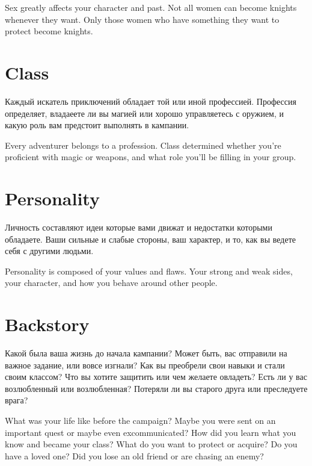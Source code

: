 \documentclass[a5paper,11pt]{book}
\begin{document}
\begin{multicols}{2}
\begin{en}
Sex greatly affects your character and past. Not all women can become knights whenever they want. Only those women who have something they want to protect become knights.
\end{en}

\section{Class}
\begin{ru}
Каждый искатель приключений обладает той или иной профессией. Профессия определяет, владаеете ли вы магией или хорошо управляетесь с оружием, и какую роль вам предстоит выполнять в кампании.
\end{ru}

\begin{en}
Every adventurer belongs to a profession. Class determined whether you're proficient with magic or weapons, and what role you'll be filling in your group.
\end{en}

\section{Personality}
\begin{ru}
Личность составляют идеи которые вами движат и недостатки которыми обладаете. Ваши сильные и слабые стороны, ваш характер, и то, как вы ведете себя с другими людьми.
\end{ru}

\begin{en}
Personality is composed of your values and flaws. Your strong and weak sides, your character, and how you behave around other people.
\end{en}

\section{Backstory}
\begin{ru}
Какой была ваша жизнь до начала кампании? Может быть, вас отправили на важное задание, или вовсе изгнали? Как вы преобрели свои навыки и стали своим классом? Что вы хотите защитить или чем желаете овладеть? Есть ли у вас возлюбленный или возлюбленная? Потеряли ли вы старого друга или преследуете врага?
\end{ru}

\begin{en}
What was your life like before the campaign? Maybe you were sent on an important quest or maybe even excommunicated? How did you learn what you know and became your class? What do you want to protect or acquire? Do you have a loved one? Did you lose an old friend or are chasing an enemy?
\end{en}


\end{multicols}
\end{document}
